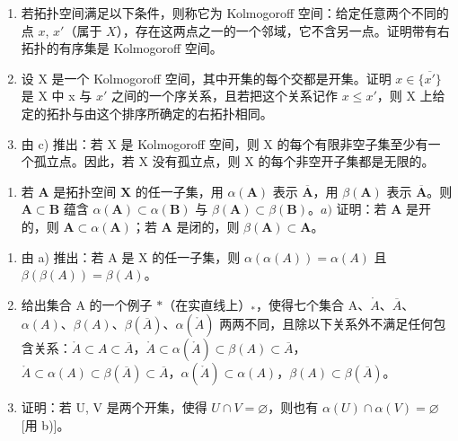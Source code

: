 \begin{enumerate}
\def\labelenumi{\alph{enumi})}
\setcounter{enumi}{1}
\item
  若拓扑空间满足以下条件，则称它为 Kolmogoroff 空间：给定任意两个不同的点 \(x\), \(x'\)（属于 \(X\)），存在这两点之一的一个邻域，它不含另一点。证明带有右拓扑的有序集是 Kolmogoroff 空间。
\item
  设 X 是一个 Kolmogoroff 空间，其中开集的每个交都是开集。证明 \(x \in \overline{\{x'\}}\) 是 X 中 x 与 \(x'\) 之间的一个序关系，且若把这个关系记作 \(x \leqslant x'\)，则 X 上给定的拓扑与由这个排序所确定的右拓扑相同。
\item
  由 c) 推出：若 X 是 Kolmogoroff 空间，则 X 的每个有限非空子集至少有一个孤立点。因此，若 X 没有孤立点，则 X 的每个非空开子集都是无限的。
\end{enumerate}

\begin{enumerate}
\def\labelenumi{\arabic{enumi})}
\setcounter{enumi}{2}
\tightlist
\item
  若 \(\mathbf{A}\) 是拓扑空间 \(\mathbf{X}\) 的任一子集，用 \(\alpha(\mathbf{A})\) 表示 \(\overline{\mathbf{A}}\)，用 \(\beta(\mathbf{A})\) 表示 \(\overline{\mathbf{A}}\)。则 \(\mathbf{A} \subset \mathbf{B}\) 蕴含 \(\alpha(\mathbf{A}) \subset \alpha(\mathbf{B})\) 与 \(\beta(\mathbf{A}) \subset \beta(\mathbf{B})\)。\(a)\) 证明：若 \(\mathbf{A}\) 是开的，则 \(\mathbf{A} \subset \alpha(\mathbf{A})\)；若 \(\mathbf{A}\) 是闭的，则 \(\beta(\mathbf{A}) \subset \mathbf{A}\)。
\end{enumerate}

\begin{enumerate}
\def\labelenumi{\alph{enumi})}
\setcounter{enumi}{1}
\item
  由 a) 推出：若 A 是 X 的任一子集，则 \(\alpha(\alpha(A)) = \alpha(A)\) 且 \(\beta(\beta(A)) = \beta(A)\)。
\item
  给出集合 A 的一个例子 \(*\)（在实直线上）\(_{*}\)，使得七个集合 A、\(\mathring{A}\)、\(\overline{A}\)、\(\alpha(A)\)、\(\beta(A)\)、\(\beta(\overline{A})\)、\(\alpha(\mathring{A})\) 两两不同，且除以下关系外不满足任何包含关系：\(\mathring{A} \subset A \subset \overline{A}\)，\(\mathring{A} \subset \alpha(\mathring{A}) \subset \beta(A) \subset \overline{A}\)，\(\mathring{A} \subset \alpha(A) \subset \beta(\overline{A}) \subset \overline{A}\)，\(\alpha(\mathring{A}) \subset \alpha(A)\)，\(\beta(A) \subset \beta(\overline{A})\)。
\item
  证明：若 U, V 是两个开集，使得 \(U \cap V = \varnothing\)，则也有 \(\alpha(U) \cap \alpha(V) = \varnothing\) {[}用 b){]}。
\end{enumerate}

